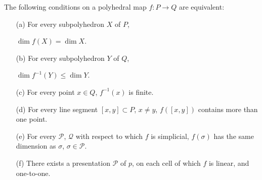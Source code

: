 \begin{proposition}\label{chap5-prop5.1.1}
The following conditions on a polyhedral map $f:P\to Q$ are equivalent:
\begin{itemize}
\item[\rm(a)] For every subpolyhedron $X$ of $P$,

$\dim f(X)=\dim X$.

\item[\rm(b)] For every subpolyhedron $Y$ of $Q$,

$\dim f^{-1}(Y)\leq \dim Y$.

\item[\rm(c)] For every point $x\in Q$, $f^{-1}(x)$ is finite.

\item[\rm(d)] For every line segment $[x,y]\subset P$, $x\neq y$, $f([x,y])$ contains more than one point.

\item[\rm(e)] For every $\mathscr{P}$, $\mathcal{Q}$ with respect to which $f$ is simplicial, $f(\sigma)$ has the same dimension as $\sigma$, $\sigma\in \mathscr{P}$. 

\item[\rm(f)] There exists a presentation $\mathscr{P}$ of $p$, on each cell of which $f$ is linear, and one-to-one.
\end{itemize}
\end{proposition}

